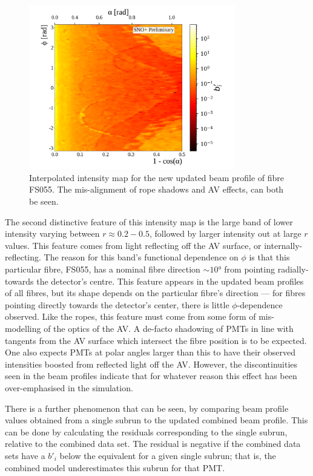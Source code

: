 \begin{figure}
    \centering
    \includegraphics[width=0.8\textwidth]{5_SMELLIESimulation/images/flat_plot_r_FS055_500k_interpolated_beam_profile_full_formatting.png}
    \caption{Interpolated intensity map for the new updated beam profile of fibre FS055. The mis-alignment of rope shadows and AV effects, can both be seen.}
    \label{fig:updated_beam_profile_sampling}
\end{figure}
The second distinctive feature of this intensity map is the large band of lower intensity varying between $r\approx0.2-0.5$, followed by larger intensity out at large $r$ values. This feature comes from light reflecting off the AV surface, or internally-reflecting. The reason for this band's functional dependence on $\phi$ is that this particular fibre, FS055, has a nominal fibre direction $\sim\ang{10}$ from pointing radially-towards the detector's centre. This feature appears in the updated beam profiles of all fibres, but its shape depends on the particular fibre's direction --- for fibres pointing directly towards the detector's center, there is little $\phi$-dependence observed. Like the ropes, this feature must come from some form of mis-modelling of the optics of the AV. A de-facto shadowing of PMTs in line with tangents from the AV surface which intersect the fibre position is to be expected. One also expects PMTs at polar angles larger than this to have their observed intensities boosted from reflected light off the AV. However, the discontinuities seen in the beam profiles indicate that for whatever reason this effect has been over-emphasised in the simulation.

There is a further phenomenon that can be seen, by comparing beam profile values obtained from a single subrun to the updated combined beam profile. This can be done by calculating the residuals corresponding to the single subrun, relative to the combined data set. The residual is negative if the combined data sets have a $b'_{i}$ below the equivalent for a given single subrun; that is, the combined model underestimates this subrun for that PMT.

